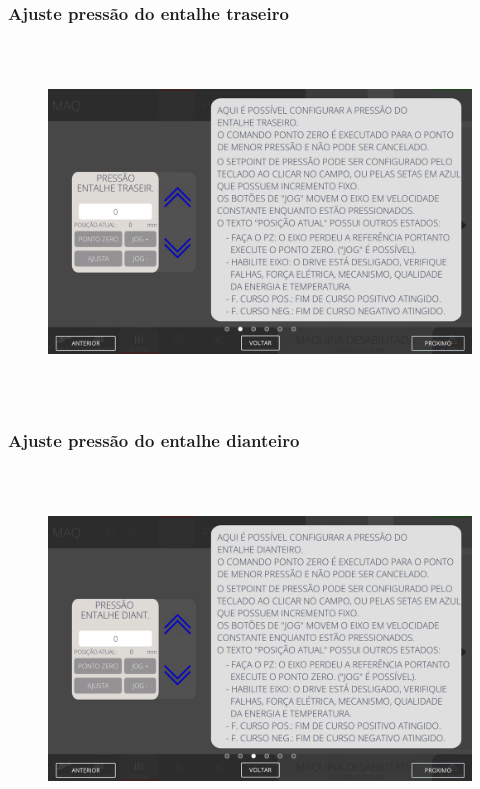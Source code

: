\newpage
\thispagestyle{fancy}
\vspace*{\fill}
\subsubsection{\small{Ajuste pressão do entalhe traseiro}}
\begin{figure}[h]
  \centering
  \includegraphics[width=576px,height=360px]{src/imagesFlexo/05-slotter/settings/e-2.png}
\end{figure}
\vspace*{\fill}

\newpage
\thispagestyle{fancy}
\vspace*{\fill}
\subsubsection{\small{Ajuste pressão do entalhe dianteiro}}
\begin{figure}[h]
  \centering
  \includegraphics[width=576px,height=360px]{src/imagesFlexo/05-slotter/settings/e-3.png}
\end{figure}
\vspace*{\fill}

